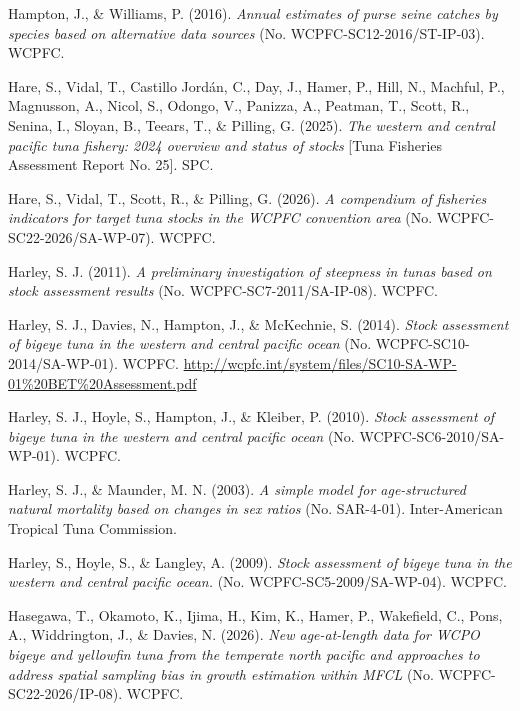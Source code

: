 \documentclass[
  english,
  a4paper,
  a4paper,
  11pt]{SCreport}
\newlength{\cslhangindent}
\newenvironment{CSLReferences}[2] %
 {\begin{list}{}{%
  \setlength{\itemindent}{0pt}
  \setlength{\leftmargin}{0pt}
  \setlength{\parsep}{0pt}
  \ifodd #1
   \setlength{\leftmargin}{\cslhangindent}
   \setlength{\itemindent}{-1\cslhangindent}
  \fi
  \setlength{\itemsep}{#2\baselineskip}}}
 {\end{list}}
\begin{document}
\begin{CSLReferences}{1}{0}
Hampton, J., \& Williams, P. (2016). \emph{Annual estimates of purse
seine catches by species based on alternative data sources} (No.
{WCPFC}-{SC}12-2016/{ST}-{IP}-03). WCPFC.

Hare, S., Vidal, T., Castillo Jordán, C., Day, J., Hamer, P., Hill, N.,
Machful, P., Magnusson, A., Nicol, S., Odongo, V., Panizza, A., Peatman,
T., Scott, R., Senina, I., Sloyan, B., Teears, T., \& Pilling, G.
(2025). \emph{The western and central pacific tuna fishery: 2024
overview and status of stocks} {[}Tuna Fisheries Assessment Report No.
25{]}. SPC.

Hare, S., Vidal, T., Scott, R., \& Pilling, G. (2026). \emph{A
compendium of fisheries indicators for target tuna stocks in the {WCPFC}
convention area} (No. {WCPFC}-{SC}22-2026/{SA}-{WP}-07). WCPFC.

Harley, S. J. (2011). \emph{A preliminary investigation of steepness in
tunas based on stock assessment results} (No.
{WCPFC}-{SC}7-2011/{SA}-{IP}-08). WCPFC.

Harley, S. J., Davies, N., Hampton, J., \& McKechnie, S. (2014).
\emph{Stock assessment of bigeye tuna in the western and central pacific
ocean} (No. {WCPFC}-{SC}10-2014/{SA}-{WP}-01). WCPFC.
\url{http://wcpfc.int/system/files/SC10-SA-WP-01\%20BET\%20Assessment.pdf}

Harley, S. J., Hoyle, S., Hampton, J., \& Kleiber, P. (2010).
\emph{Stock assessment of bigeye tuna in the western and central pacific
ocean} (No. {WCPFC}-{SC}6-2010/{SA}-{WP}-01). WCPFC.

Harley, S. J., \& Maunder, M. N. (2003). \emph{A simple model for
age-structured natural mortality based on changes in sex ratios} (No.
{SAR}-4-01). Inter-American Tropical Tuna Commission.

Harley, S., Hoyle, S., \& Langley, A. (2009). \emph{Stock assessment of
bigeye tuna in the western and central pacific ocean.} (No.
{WCPFC}-{SC}5-2009/{SA}-{WP}-04). WCPFC.

Hasegawa, T., Okamoto, K., Ijima, H., Kim, K., Hamer, P., Wakefield, C.,
Pons, A., Widdrington, J., \& Davies, N. (2026). \emph{New age-at-length
data for {WCPO} bigeye and yellowfin tuna from the temperate north
pacific and approaches to address spatial sampling bias in growth
estimation within {MFCL}} (No. {WCPFC}-{SC}22-2026/{IP}-08). WCPFC.


\end{CSLReferences}
\end{document}

